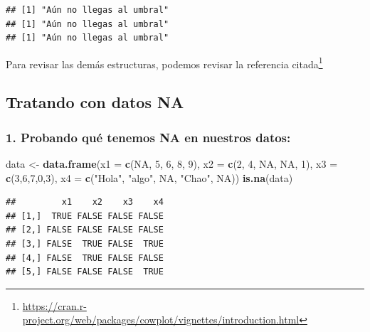 \documentclass[
]{book}
\newenvironment{Shaded}{\begin{snugshade}}{\end{snugshade}}
\newcommand{\AttributeTok}[1]{\textcolor[rgb]{0.13,0.29,0.53}{#1}}
\newcommand{\ConstantTok}[1]{\textcolor[rgb]{0.56,0.35,0.01}{#1}}
\newcommand{\DecValTok}[1]{\textcolor[rgb]{0.00,0.00,0.81}{#1}}
\newcommand{\FunctionTok}[1]{\textcolor[rgb]{0.13,0.29,0.53}{\textbf{#1}}}
\newcommand{\NormalTok}[1]{#1}
\newcommand{\OtherTok}[1]{\textcolor[rgb]{0.56,0.35,0.01}{#1}}
\newcommand{\StringTok}[1]{\textcolor[rgb]{0.31,0.60,0.02}{#1}}
\begin{document}
\begin{verbatim}
## [1] "Aún no llegas al umbral"
## [1] "Aún no llegas al umbral"
## [1] "Aún no llegas al umbral"
\end{verbatim}

Para revisar las demás estructuras, podemos revisar la referencia citada\footnote{\url{https://cran.r-project.org/web/packages/cowplot/vignettes/introduction.html}}

\subsection{Tratando con datos NA}\label{tratando-con-datos-na}

\subsubsection{1. Probando qué tenemos NA en nuestros datos:}\label{probando-quuxe9-tenemos-na-en-nuestros-datos}

\begin{Shaded}
\begin{Highlighting}[]
\NormalTok{data }\OtherTok{\textless{}{-}} \FunctionTok{data.frame}\NormalTok{(}\AttributeTok{x1 =} \FunctionTok{c}\NormalTok{(}\ConstantTok{NA}\NormalTok{, }\DecValTok{5}\NormalTok{, }\DecValTok{6}\NormalTok{, }\DecValTok{8}\NormalTok{, }\DecValTok{9}\NormalTok{),   }
                        \AttributeTok{x2 =} \FunctionTok{c}\NormalTok{(}\DecValTok{2}\NormalTok{, }\DecValTok{4}\NormalTok{, }\ConstantTok{NA}\NormalTok{, }\ConstantTok{NA}\NormalTok{, }\DecValTok{1}\NormalTok{), }
                        \AttributeTok{x3 =} \FunctionTok{c}\NormalTok{(}\DecValTok{3}\NormalTok{,}\DecValTok{6}\NormalTok{,}\DecValTok{7}\NormalTok{,}\DecValTok{0}\NormalTok{,}\DecValTok{3}\NormalTok{), }
                        \AttributeTok{x4 =} \FunctionTok{c}\NormalTok{(}\StringTok{"Hola"}\NormalTok{, }\StringTok{"algo"}\NormalTok{,}
                               \ConstantTok{NA}\NormalTok{, }\StringTok{"Chao"}\NormalTok{, }\ConstantTok{NA}\NormalTok{)) }
\FunctionTok{is.na}\NormalTok{(data) }
\end{Highlighting}
\end{Shaded}

\begin{verbatim}
##         x1    x2    x3    x4
## [1,]  TRUE FALSE FALSE FALSE
## [2,] FALSE FALSE FALSE FALSE
## [3,] FALSE  TRUE FALSE  TRUE
## [4,] FALSE  TRUE FALSE FALSE
## [5,] FALSE FALSE FALSE  TRUE
\end{verbatim}
\end{document}
